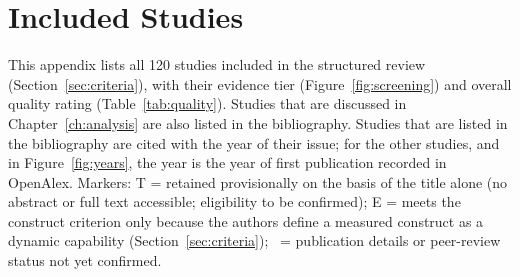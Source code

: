 %

\chapter{Included Studies}
\label{AppendixC}

This appendix lists all 120 studies included in the structured review (Section~\ref{sec:criteria}), with their evidence tier (Figure~\ref{fig:screening}) and overall quality rating (Table~\ref{tab:quality}). Studies that are discussed in Chapter~\ref{ch:analysis} are also listed in the bibliography. Studies that are listed in the bibliography are cited with the year of their issue; for the other studies, and in Figure~\ref{fig:years}, the year is the year of first publication recorded in OpenAlex. Markers: T = retained provisionally on the basis of the title alone (no abstract or full text accessible; eligibility to be confirmed); E = meets the construct criterion only because the authors define a measured construct as a dynamic capability (Section~\ref{sec:criteria}); \dag\ = publication details or peer-review status not yet confirmed.

